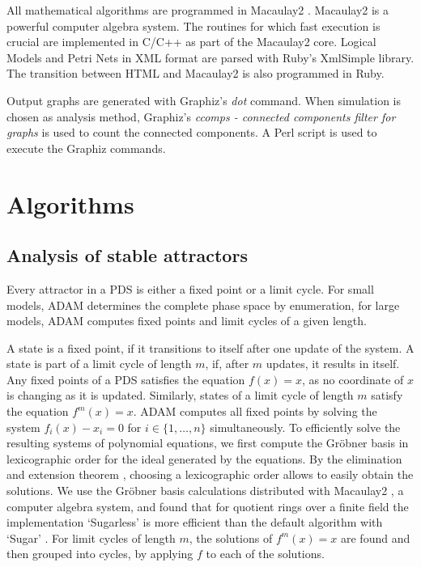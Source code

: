 \documentclass[11pt]{amsart}
\begin{document}
All mathematical algorithms are programmed in Macaulay2 \cite{M2}. Macaulay2 is a powerful computer algebra system. The routines for which fast execution is crucial are implemented in C/C++ as part of the Macaulay2 core. 
Logical Models and Petri Nets in XML format are parsed with Ruby's XmlSimple library. The transition between HTML and Macaulay2 is also programmed in Ruby. 

Output graphs are generated with Graphiz's {\it dot} command. When simulation is chosen as analysis method, Graphiz's {\it ccomps - connected components filter for graphs} is used to count the connected components. A Perl script is used to execute the Graphiz commands. 



\section{Algorithms}
\subsection{Analysis of stable attractors}
Every attractor in a PDS is either a
fixed point or a limit cycle. For small models, ADAM determines the complete
phase space by enumeration, for large models, ADAM computes fixed points and
limit cycles of a given length. 

A state is a fixed point, if it transitions to itself after one update of the
system. A state is part of a limit cycle of length $m$, if,
after $m$ updates, it results in itself. Any fixed points of a PDS satisfies
the equation $f(x) = x$, as no coordinate of $x$ is changing as it is updated. 
Similarly, states of a
limit cycle of length $m$ satisfy the equation $f^m(x) = x$. ADAM computes all
fixed points by solving the system $f_i(x) - x_i = 0$ for $i \in \{1, \ldots,
n\}$ simultaneously. To efficiently solve the resulting systems of polynomial
equations, we first compute the Gr\"obner
basis in lexicographic order for the ideal generated by the equations.
By the elimination and extension theorem \cite{IVA}, choosing a lexicographic order
allows to easily obtain the solutions.
We use the Gr\"obner basis calculations distributed with Macaulay2 \cite{M2}, a
computer algebra system, and found that for quotient rings over a finite field
the implementation `Sugarless' is more efficient than the default algorithm
with `Sugar' \cite{Sugar:1991}. 
For limit cycles of length $m$, the solutions of $f^m(x)=x$ are found and then
grouped into cycles, by applying $f$ to each of the solutions. 
\end{document}
